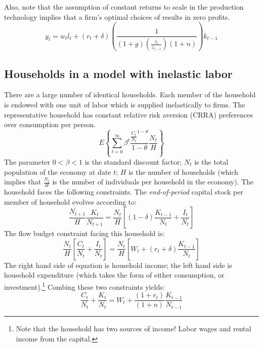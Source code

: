 \documentclass[11pt]{article}
\begin{document}
Also, note that the assumption of constant returns to scale in the production technology implies that a firm's optimal choices of results in zero profits.
	\begin{equation}
		y_{t} = w_{t}l_{t} + (r_{t} + \delta)\left(\frac{1}{(1 + g)\left(\frac{z_t}{z_{t-1}}\right)(1 + n)}\right)k_{t-1}
	\end{equation}

\subsection{Households in a model with inelastic labor}
There are a large number of identical households.  Each member of the household is endowed with one unit of labor which is supplied inelastically to firms.   The representative household has constant relative risk aversion (CRRA) preferences over consumption per person.
	\begin{equation}\label{eq:HHlifetimeUtility}
		E\left\{\sum_{t=0}^{\infty} \beta^t \frac{\frac{C_t}{N_t}^{1-\theta}}{1-\theta} \frac{N_{t}}{H}\right\}
	\end{equation}
The parameter $0 < \beta < 1$ is the standard discount factor; $N_{t}$ is the total population of the economy at date $t$; $H$ is the number of households (which implies that $\frac{N_{t}}{H}$ is the number of individuals per household in the economy).  The household faces the following constraints.  The \textit{end-of-period} capital stock per member of household evolves according to:
	\begin{equation}\label{eq:motionCapital}
		\frac{N_{t+1}}{H}\frac{K_t}{N_{t+1}} = \frac{N_t}{H}\left[(1 - \delta)\frac{K_{t-1}}{N_t} + \frac{I_{t}}{N_t}\right] 
	\end{equation}
The flow budget constraint facing this household is:
	\begin{equation}\label{eq:HHflowBudgetConstraint}
		\frac{N_{t}}{H}\left[\frac{C_{t}}{N_{t}} + \frac{I_{t}}{N_{t}}\right] = \frac{N_{t}}{H}\left[W_{t} + (r_{t} + \delta)\frac{K_{t-1}}{N_t}\right]  
	\end{equation}
The right hand side of equation \label{eq:HHflowBudgetConstraint} is household income; the left hand side is household expenditure (which takes the form of either consumption, or investment).\footnote{Note that the household has two sources of income! Labor wages and rental income from the capital.} Combing these two constraints yields:
	\begin{equation}
		\frac{C_{t}}{N_{t}} + \frac{K_t}{N_t} = W_{t} + \frac{(1 + r_{t})}{(1+n)}\frac{K_{t-1}}{N_{t-1}} 
	\end{equation}
	
\end{document}

